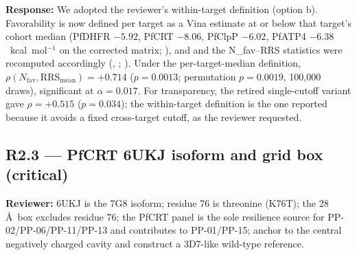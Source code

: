 \documentclass[11pt]{article}
\begin{document}
\textbf{Response:} We adopted the reviewer's within-target definition (option b).
Favorability is now defined per target as a Vina estimate at or below that
target's cohort median (PfDHFR $-5.92$, PfCRT $-8.06$, PfClpP $-6.02$, PfATP4
$-6.38$~kcal~mol$^{-1}$ on the corrected matrix; ), and  and
the N\_fav--RRS statistics were recomputed accordingly (, ; ). Under the per-target-median definition, $\rho(N_{\mathrm{fav}},\mathrm{RRS}_{\mathrm{mean}})=+0.714$
($p=0.0013$; permutation $p=0.0019$, 100{,}000 draws), significant at
$\alpha=0.017$. For transparency, the retired single-cutoff variant gave
$\rho=+0.515$ ($p=0.034$); the within-target definition is the one reported
because it avoids a fixed cross-target cutoff, as the reviewer requested.

\subsection*{R2.3 --- PfCRT 6UKJ isoform and grid box (critical)}
\textbf{Reviewer:} 6UKJ is the 7G8 isoform; residue 76 is threonine (K76T); the 28 \AA\ box
excludes residue 76; the PfCRT panel is the sole resilience source for PP-02/PP-06/PP-11/PP-13
and contributes to PP-01/PP-15; anchor to the central negatively charged cavity and construct a
3D7-like wild-type reference.
\end{document}
